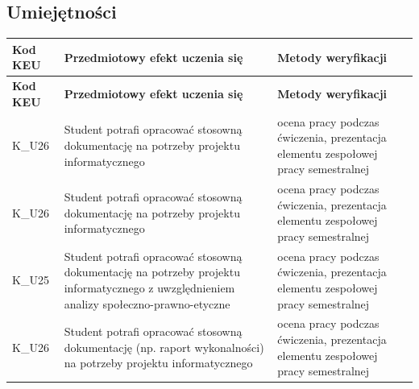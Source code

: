 \documentclass[12pt, a4paper]{article}
\newcommand{\thdrule}{\noalign{\global\setlength{\extrarowheight}{0pt}}}
\newcommand{\thdend}{\noalign{\global\setlength{\extrarowheight}{3pt}}}
\begin{document}
\subsection*{Umiejętności}
{\scriptsize
\begin{longtable}{m{1.6cm}m{9.0cm}m{4.2cm}}
\thdrule\toprule
\rowcolor{pjatkRed} {\color{white}\footnotesize\textbf{\vphantom{Ag}Kod KEU}} & {\color{white}\footnotesize\textbf{\vphantom{Ag}Przedmiotowy efekt uczenia się}} & {\color{white}\footnotesize\textbf{\vphantom{Ag}Metody weryfikacji}} \\
\midrule\thdend
\endfirsthead
\thdrule\toprule
\rowcolor{pjatkRed} {\color{white}\footnotesize\textbf{\vphantom{Ag}Kod KEU}} & {\color{white}\footnotesize\textbf{\vphantom{Ag}Przedmiotowy efekt uczenia się}} & {\color{white}\footnotesize\textbf{\vphantom{Ag}Metody weryfikacji}} \\
\midrule\thdend
\endhead
  \rowcolor{tableRowLight} K\_U26 & Student potrafi opracować stosowną dokumentację na potrzeby projektu informatycznego & ocena pracy podczas ćwiczenia, prezentacja elementu zespołowej pracy semestralnej \\
  \rowcolor{tableRowAlt} K\_U26 & Student potrafi  opracować stosowną dokumentację na potrzeby projektu informatycznego & ocena pracy podczas ćwiczenia, prezentacja elementu zespołowej pracy semestralnej \\
  \rowcolor{tableRowLight} K\_U25 & Student potrafi  opracować stosowną dokumentację na potrzeby projektu informatycznego z uwzględnieniem analizy społeczno-prawno-etyczne & ocena pracy podczas ćwiczenia, prezentacja elementu zespołowej pracy semestralnej \\
  \rowcolor{tableRowAlt} K\_U26 & Student potrafi  opracować stosowną dokumentację (np. raport wykonalności) na potrzeby projektu informatycznego & ocena pracy podczas ćwiczenia, prezentacja elementu zespołowej pracy semestralnej \\
\bottomrule
\end{longtable}}
\end{document}
